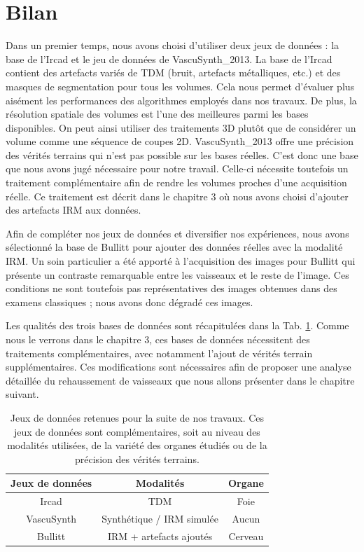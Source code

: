\section{Bilan}

Dans un premier temps, nous avons choisi d'utiliser deux jeux de données : la base de l'Ircad et le jeu de données de VascuSynth\_2013. La base de l'Ircad contient des artefacts variés de TDM (bruit, artefacts métalliques, etc.) et des masques de segmentation pour tous les volumes. Cela nous permet d'évaluer plus aisément les performances des algorithmes employés dans nos travaux. De plus, la résolution spatiale des volumes est l'une des meilleures parmi les bases disponibles. On peut ainsi utiliser des traitements 3D plutôt que de considérer un volume comme une séquence de coupes 2D. VascuSynth\_2013 offre une précision des vérités terrains qui n'est pas possible sur les bases réelles. C'est donc une base que nous avons jugé nécessaire pour notre travail. Celle-ci nécessite toutefois un traitement complémentaire afin de rendre les volumes proches d'une acquisition réelle. Ce traitement est décrit dans le chapitre 3 où nous avons choisi d'ajouter des artefacts IRM aux données.

Afin de compléter nos jeux de données et diversifier nos expériences, nous avons sélectionné la base de Bullitt pour ajouter des données réelles avec la modalité IRM. Un soin particulier a été apporté à l'acquisition des images pour Bullitt qui présente un contraste remarquable entre les vaisseaux et le reste de l'image. Ces conditions ne sont toutefois pas représentatives des images obtenues dans des examens classiques ; nous avons donc dégradé ces images.

Les qualités des trois bases de données sont récapitulées dans la Tab. \ref{tab:db_for_exp}. Comme nous le verrons dans le chapitre 3, ces bases de données nécessitent des traitements complémentaires, avec notamment l'ajout de vérités terrain supplémentaires. Ces modifications sont nécessaires afin de proposer une analyse détaillée du rehaussement de vaisseaux que nous allons présenter dans le chapitre suivant.

\begin{table}
    \centering
    \begin{tabular}{ c|c|c }
        \hline
        Jeux de données & Modalités & Organe \\
        \hline
        Ircad           & TDM & Foie \\
        VascuSynth      & Synthétique / IRM simulée & Aucun \\
        Bullitt         & IRM + artefacts ajoutés & Cerveau \\
        \hline
    \end{tabular}
    \caption{Jeux de données retenues pour la suite de nos travaux. Ces jeux de données sont complémentaires, soit au niveau des modalités utilisées, de la variété des organes étudiés ou de la précision des vérités terrains.}
    \label{tab:db_for_exp}
  \end{table}



